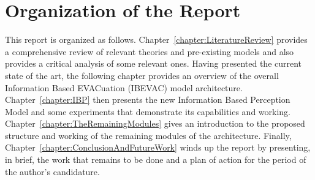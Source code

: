 \section{Organization of the Report}
\label{Intro:Organisation}
 This report is organized as follows. Chapter~\ref{chapter:LiteratureReview} provides a comprehensive review of relevant theories and pre-existing models and also provides a critical analysis of some relevant ones. Having presented the current state of the art, the following chapter provides an overview of the overall Information Based EVACuation (IBEVAC) model architecture. Chapter~\ref{chapter:IBP} then presents the new Information Based Perception Model and some experiments that demonstrate its capabilities and working. Chapter~\ref{chapter:TheRemainingModules} gives an introduction to the proposed structure and working of the remaining modules of the architecture. Finally, Chapter~\ref{chapter:ConclusionAndFutureWork} winds up the report by presenting, in brief, the work that remains to be done and a plan of action for the period of the author's candidature.


